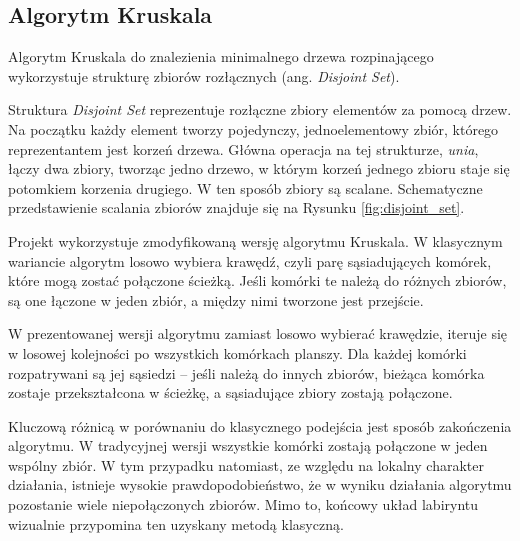 \subsection{Algorytm Kruskala}

Algorytm Kruskala do znalezienia minimalnego drzewa rozpinającego wykorzystuje strukturę zbiorów rozłącznych (ang. \textit{Disjoint Set}).

Struktura \textit{Disjoint Set} reprezentuje rozłączne zbiory elementów za pomocą drzew. Na początku każdy element tworzy pojedynczy, jednoelementowy zbiór, którego reprezentantem jest korzeń drzewa. Główna operacja na tej strukturze, \textit{unia}, łączy dwa zbiory, tworząc jedno drzewo, w którym korzeń jednego zbioru staje się potomkiem korzenia drugiego. W ten sposób zbiory są scalane. Schematyczne przedstawienie scalania zbiorów znajduje się na Rysunku \ref{fig:disjoint_set}.



Projekt wykorzystuje zmodyfikowaną wersję algorytmu Kruskala. W klasycznym wariancie algorytm losowo wybiera krawędź, czyli parę sąsiadujących komórek, które mogą zostać połączone ścieżką. Jeśli komórki te należą do różnych zbiorów, są one łączone w jeden zbiór, a między nimi tworzone jest przejście.

W prezentowanej wersji algorytmu zamiast losowo wybierać krawędzie, iteruje się w losowej kolejności po wszystkich komórkach planszy. Dla każdej komórki rozpatrywani są jej sąsiedzi – jeśli należą do innych zbiorów, bieżąca komórka zostaje przekształcona w ścieżkę, a sąsiadujące zbiory zostają połączone.

Kluczową różnicą w porównaniu do klasycznego podejścia jest sposób zakończenia algorytmu. W tradycyjnej wersji wszystkie komórki zostają połączone w jeden wspólny zbiór. W tym przypadku natomiast, ze względu na lokalny charakter działania, istnieje wysokie prawdopodobieństwo, że w wyniku działania algorytmu pozostanie wiele niepołączonych zbiorów. Mimo to, końcowy układ labiryntu wizualnie przypomina ten uzyskany metodą klasyczną.

